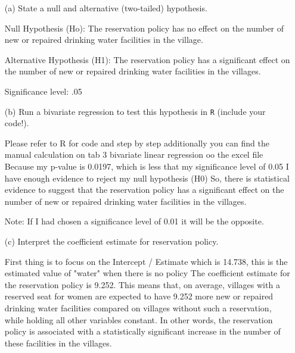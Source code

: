 \documentclass[12pt,letterpaper]{article}
\begin{document}
\newpage
\begin{enumerate}
	\item [(a)] State a null and alternative (two-tailed) hypothesis. 
	
	Null Hypothesis (Ho): The reservation policy has no effect on the number of new or repaired drinking water facilities in the village.
	
	Alternative Hypothesis (H1): The reservation policy has a significant effect on the number of new or repaired drinking water facilities in the villages.
	
	Significance level: .05
	
	\vspace{6cm}
	\item [(b)] Run a bivariate regression to test this hypothesis in \texttt{R} (include your code!).
	
	Please refer to R for code and step by step additionally you can find the manual calculation on tab 3 bivariate linear regression oo the excel file
	Because my p-value is 0.0197, which is less that my significance level of 0.05	I have enough evidence to reject my null hypothesis (H0)
	So, there is statistical evidence to suggest that the reservation policy has a significant effect on the number of new or repaired drinking water facilities in the villages.
	
	Note: If I had chosen a significance level of 0.01 it will be the opposite.
	
	\vspace{6cm}
	\item [(c)] Interpret the coefficient estimate for reservation policy. 
	
	First thing is to focus on the Intercept / Estimate which is 14.738, this is the estimated value of "water" when there is no policy
	The coefficient estimate for the reservation policy is 9.252. This means that, on average, villages with a reserved seat for women are expected to have 9.252 more new or 
	repaired drinking water facilities compared on villages without such a reservation, while holding all other variables constant. In other words, the reservation policy is 
	associated with a statistically significant increase in the number of these facilities in the villages.
	
	
\end{enumerate}
\end{document}
